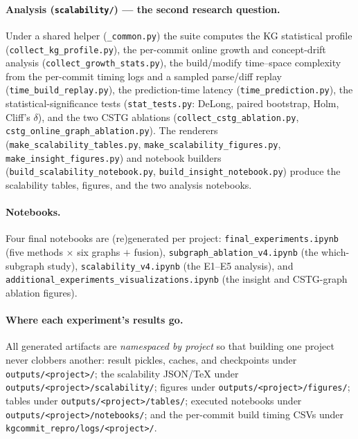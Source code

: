 \documentclass[11pt,a4paper]{article}
\newcommand{\code}[1]{\texttt{#1}}
\begin{document}
	\paragraph{Analysis (\code{scalability/}) --- the second research question.}
	Under a shared helper (\code{\_common.py}) the suite computes the KG statistical
	profile (\code{collect\_kg\_profile.py}), the per-commit online growth and
	concept-drift analysis (\code{collect\_growth\_stats.py}), the build/modify
	time--space complexity from the per-commit timing logs and a sampled parse/diff
	replay (\code{time\_build\_replay.py}), the prediction-time latency
	(\code{time\_prediction.py}), the statistical-significance tests
	(\code{stat\_tests.py}: DeLong, paired bootstrap, Holm, Cliff's $\delta$), and the
	two CSTG ablations (\code{collect\_cstg\_ablation.py},
	\code{cstg\_online\_graph\_ablation.py}). The renderers
	(\code{make\_scalability\_tables.py}, \code{make\_scalability\_figures.py},
	\code{make\_insight\_figures.py}) and notebook builders
	(\code{build\_scalability\_notebook.py}, \code{build\_insight\_notebook.py})
	produce the scalability tables, figures, and the two analysis notebooks.

	\paragraph{Notebooks.} Four final notebooks are (re)generated per project:
	\code{final\_experiments.ipynb} (five methods $\times$ six graphs $+$ fusion),
	\code{subgraph\_ablation\_v4.ipynb} (the which-subgraph study),
	\code{scalability\_v4.ipynb} (the E1--E5 analysis), and
	\code{additional\_experiments\_visualizations.ipynb} (the insight and CSTG-graph
	ablation figures).

	\paragraph{Where each experiment's results go.} All generated artifacts are
	\emph{namespaced by project} so that building one project never clobbers another:
	result pickles, caches, and checkpoints under \code{outputs/<project>/}; the
	scalability JSON/TeX under \code{outputs/<project>/scalability/}; figures under
	\code{outputs/<project>/figures/}; tables under \code{outputs/<project>/tables/};
	executed notebooks under \code{outputs/<project>/notebooks/}; and the per-commit
	build timing CSVs under \code{kgcommit\_repro/logs/<project>/}.
\end{document}
